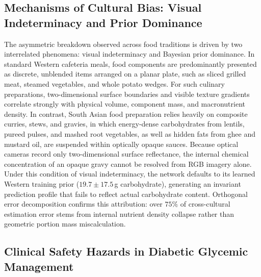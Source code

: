 \documentclass[utf8]{FrontiersinVancouver}
\begin{document}
\subsection{Mechanisms of Cultural Bias: Visual Indeterminacy and Prior Dominance}

The asymmetric breakdown observed across food traditions is driven by two interrelated phenomena: visual indeterminacy and Bayesian prior dominance. In standard Western cafeteria meals, food components are predominantly presented as discrete, unblended items arranged on a planar plate, such as sliced grilled meat, steamed vegetables, and whole potato wedges. For such culinary preparations, two-dimensional surface boundaries and visible texture gradients correlate strongly with physical volume, component mass, and macronutrient density. In contrast, South Asian food preparation relies heavily on composite curries, stews, and gravies, in which energy-dense carbohydrates from lentils, pureed pulses, and mashed root vegetables, as well as hidden fats from ghee and mustard oil, are suspended within optically opaque sauces. Because optical cameras record only two-dimensional surface reflectance, the internal chemical concentration of an opaque gravy cannot be resolved from RGB imagery alone. Under this condition of visual indeterminacy, the network defaults to its learned Western training prior ($19.7 \pm 17.5$\,g carbohydrate), generating an invariant prediction profile that fails to reflect actual carbohydrate content. Orthogonal error decomposition confirms this attribution: over $75\%$ of cross-cultural estimation error stems from internal nutrient density collapse rather than geometric portion mass miscalculation.

\subsection{Clinical Safety Hazards in Diabetic Glycemic Management}
\end{document}
